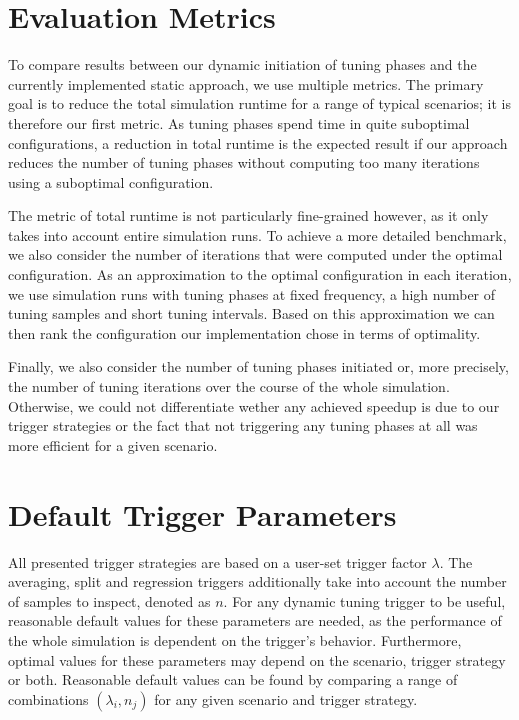 
\section{Evaluation Metrics}
\label{sec:metrics}
To compare results between our dynamic initiation of tuning phases and the currently implemented static approach, we use multiple metrics.
The primary goal is to reduce the total simulation runtime for a range of typical scenarios; it is therefore our first metric. As tuning phases spend time in quite suboptimal configurations, a reduction in total runtime is the expected result if our approach reduces the number of tuning phases without computing too many iterations using a suboptimal configuration.

The metric of total runtime is not particularly fine-grained however, as it only takes into account entire simulation runs. To achieve a more detailed benchmark, we also consider the number of iterations that were computed under the optimal configuration. As an approximation to the optimal configuration in each iteration, we use simulation runs with tuning phases at fixed frequency, a high number of tuning samples and short tuning intervals. Based on this approximation we can then rank the configuration our implementation chose in terms of optimality.

Finally, we also consider the number of tuning phases initiated or, more precisely, the number of tuning iterations over the course of the whole simulation. Otherwise, we could not differentiate wether any achieved speedup is due to our trigger strategies or the fact that not triggering any tuning phases at all was more efficient for a given scenario.

\section{Default Trigger Parameters}
\label{sec:default_params}
All presented trigger strategies are based on a user-set trigger factor $\lambda$. The averaging, split and regression triggers additionally take into account the number of samples to inspect, denoted as $n$. For any dynamic tuning trigger to be useful, reasonable default values for these parameters are needed, as the performance of the whole simulation is dependent on the trigger's behavior.
Furthermore, optimal values for these parameters may depend on the scenario, trigger strategy or both.
Reasonable default values can be found by comparing a range of combinations $\left(\lambda_i, n_j\right)$ for any given scenario and trigger strategy.



